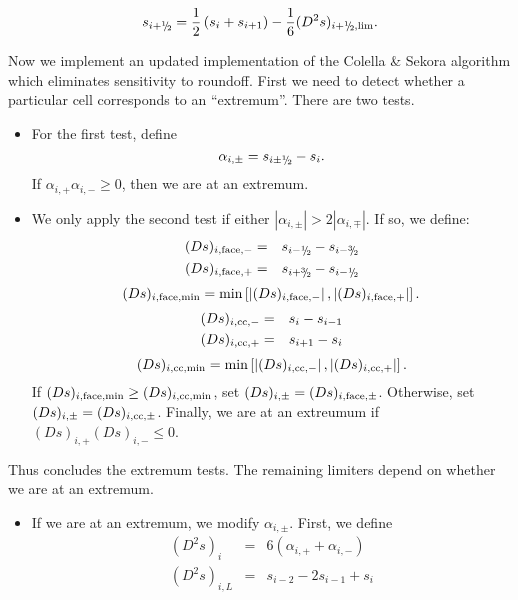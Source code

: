\begin{itemize}
\begin{enumerate}
\begin{equation}
s_{i+\myhalf} = \frac{1}{2}\left(s_{i}+s_{i+1}\right) - \frac{1}{6}(D^2s)_{i+\myhalf,\text{lim}}.
\end{equation}
\end{enumerate}
Now we implement an updated implementation of the Colella \& Sekora
 algorithm which eliminates sensitivity to roundoff.  First we
need to detect whether a particular cell corresponds to an
``extremum''.  There are two tests.
\begin{itemize}
\item For the first test, define
\begin{equation}
\alpha_{i,\pm} = s_{i\pm\myhalf} - s_i.
\end{equation}
If $\alpha_{i,+}\alpha_{i,-} \ge 0$, then we are at an extremum.
\item We only apply the second test if either $|\alpha_{i,\pm}| >
  2|\alpha_{i,\mp}|$.  If so, we define:
\begin{eqnarray}
(Ds)_{i,{\rm face},-} &=& s_{i-\myhalf} - s_{i-\sfrac{3}{2}} \\
(Ds)_{i,{\rm face},+} &=& s_{i+\sfrac{3}{2}} - s_{i-\myhalf}
\end{eqnarray}
\begin{equation}
(Ds)_{i,{\rm face,min}} = \min\left[\left|(Ds)_{i,{\rm face},-}\right|,\left|(Ds)_{i,{\rm face},+}\right|\right].
\end{equation}
\begin{eqnarray}
(Ds)_{i,{\rm cc},-} &=& s_{i} - s_{i-1} \\
(Ds)_{i,{\rm cc},+} &=& s_{i+1} - s_{i}
\end{eqnarray}
\begin{equation}
(Ds)_{i,{\rm cc,min}} = \min\left[\left|(Ds)_{i,{\rm cc},-}\right|,\left|(Ds)_{i,{\rm cc},+}\right|\right].
\end{equation}
If $(Ds)_{i,{\rm face,min}} \ge (Ds)_{i,{\rm cc,min}}$, set 
$(Ds)_{i,\pm} = (Ds)_{i,{\rm face},\pm}$.  Otherwise, set 
$(Ds)_{i,\pm} = (Ds)_{i,{\rm cc},\pm}$.  Finally, we are at an extreumum if
$(Ds)_{i,+}(Ds)_{i,-} \le 0$.
\end{itemize}
Thus concludes the extremum tests.  The remaining limiters depend on
whether we are at an extremum.
\begin{itemize}
\item If we are at an extremum, we modify $\alpha_{i,\pm}$.  First, we
  define
\begin{eqnarray}
(D^2s)_{i} &=& 6(\alpha_{i,+}+\alpha_{i,-}) \\
(D^2s)_{i,L} &=& s_{i-2}-2s_{i-1}+s_{i} \\

\end{eqnarray}
\end{itemize}
\end{itemize}
